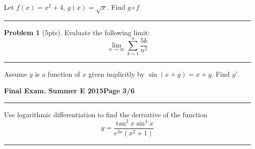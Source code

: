 \documentclass[12pt]{article}
\theoremstyle{definition}
\newtheorem{problem}{Problem}
\begin{document}
{ Let $f(x) = x^2+4$, $g(x) = \sqrt{x}$.  Find $g \circ f$
\vspace{2cm}
\begin{flushright}
\end{flushright}
\hrule

\begin{problem}[5pts]
Evaluate the following limit:
\begin{equation*}
\lim_{n \to \infty} \sum_{k=1}^n \frac{5k}{n^2}
\end{equation*}

\vspace{3cm}
\begin{flushright}
\end{flushright}
\end{problem}
\hrule

{\problem[5 pts] Assume $y$ is a function of $x$ given implicitly by $\sin(x+y)=x+y$.  Find $y'$.}
\vspace{4.9cm}
\begin{flushright}
\end{flushright}
\newpage


\hfill{\large\bf Final Exam.}\hfill{\large\bf
  Summer E 2015}\hfill{\large\bf Page 3/6}\hrule

\bigskip


{\problem [10 pts] Use logarithmic differentiation to find the
  derivative of the function 
\begin{equation*}
y=\frac{\tan^2 x \sin^4 x}{e^{3x}(x^2+1)}
\end{equation*}
\vspace{8cm}
\begin{flushright}
\end{flushright}
\hrule

}}
\end{document}

